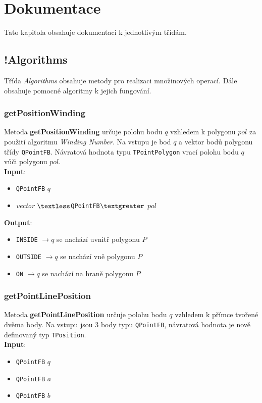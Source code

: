 \documentclass[a4paper, 12pt]{article}
\begin{document}
 
\section{Dokumentace}
Tato kapitola obsahuje dokumentaci k jednotlivým třídám.

\subsection{!Algorithms}
Třída \textit{Algorithms} obsahuje metody pro realizaci množinových operací. Dále obsahuje pomocné algoritmy k jejich fungování.

\subsubsection*{getPositionWinding}
Metoda \textbf{getPositionWinding} určuje polohu bodu $q$ vzhledem k polygonu $pol$ za použití algoritmu \textsl{Winding Number}. Na vstupu je bod $q$ a vektor bodů polygonu třídy \texttt{QPointFB}. Návratová hodnota typu \texttt{TPointPolygon} vrací polohu bodu $q$ vůči polygonu $pol$.\\

\textbf{Input}:
\begin{itemize}
\item \texttt{QPointFB} $q$
\item \textsl{vector} $\textless$\texttt{QPointFB}$\textgreater$ $pol$
\end{itemize}

\textbf{Output}:
\begin{itemize}
\item \texttt{INSIDE} $\rightarrow q$ se nachází uvnitř polygonu $P$
\item \texttt{OUTSIDE} $\rightarrow q$ se nachází vně polygonu $P$
\item \texttt{ON} $\rightarrow q$ se nachází na hraně polygonu $P$
\end{itemize}

\subsubsection*{getPointLinePosition}
Metoda \textbf{getPointLinePosition} určuje polohu bodu $q$ vzhledem k přímce tvořené dvěma body. Na vstupu jsou 3 body typu \texttt{QPointFB}, návratová hodnota je nově definovaný typ \texttt{TPosition}.\\

\textbf{Input}:
\begin{itemize}
\item \texttt{QPointFB} $q$
\item \texttt{QPointFB} $a$
\item \texttt{QPointFB} $b$
\end{itemize}
\end{document}
